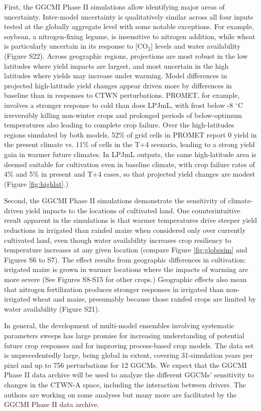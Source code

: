 \documentclass[gmd, manuscript]{copernicus} %
\begin{document}
{First, the GGCMI Phase II simulations allow identifying major areas of uncertainty. 
Inter-model uncertainty is qualitatively similar across all four inputs tested at the globally aggregate level with some notable exceptions. 
For example, soybean, a nitrogen-fixing legume, is insensitive to nitrogen addition, while wheat is particularly uncertain in its response to [CO$_2$] levels and water availability (Figure S22). 
Across geographic regions, projections are most robust in the low latitudes where yield impacts are largest, and most uncertain in the high latitudes where yields may increase under warming. 
Model differences in projected high-latitude yield changes appear driven more by differences in baseline than in responses to CTWN perturbations.  
PROMET, for example, involves a stronger response to cold than does LPJmL, with frost below -8 $^\circ$C irreversibly killing non-winter crops and prolonged periods of below-optimum temperatures also leading to complete crop failure. 
Over the high-latitudes regions simulated by both models, 52\% of grid cells in PROMET report 0 yield in the present climate vs. 11\% of cells in the T+4 scenario, leading to a strong yield gain in warmer future climates. 
In LPJmL outputs, the same high-latitude area is deemed suitable for cultivation even in baseline climate, with crop failure rates of 4\% and 5\% in present and T+4 cases, so that projected yield changes are modest (Figure \ref{fig:highlat}.)

Second, the GGCMI Phase II simulations demonstrate the sensitivity of climate-driven yield impacts to the locations of cultivated land. 
One counterintuitive result apparent in the simulations is that warmer temperatures drive steeper yield reductions in irrigated than rainfed maize when considered only over currently cultivated land, even though water availability increases crop resiliency to temperature increases at any given location (compare Figure \ref{fig:globesim} and Figures S6 to S7). 
The effect results from geographic differences in cultivation: irrigated maize is grown in warmer locations where the impacts of warming are more severe (See Figures S8-S15 for other crops.) 
Geographic effects also mean that nitrogen fertilization produces stronger responses in irrigated than non-irrigated wheat and maize, presumably because those rainfed crops are limited by water availability (Figure S21).

In general, the development of multi-model ensembles involving systematic parameters sweeps has large promise for increasing understanding of potential future crop responses and for improving process-based crop models.
The data set is unprecedentedly large, being global in extent, covering 31-simulation years per pixel and up to 756 perturbations for 12 GGCMs.
We expect that the GGCMI Phase II data archive will be used to analyze the different GGCMs' sensitivity to changes in the CTWN-A space, including the interaction between drivers.
The authors are working on some analyses but many more are facilitated by the GGCMI Phase II data archive. 

}
\end{document}
